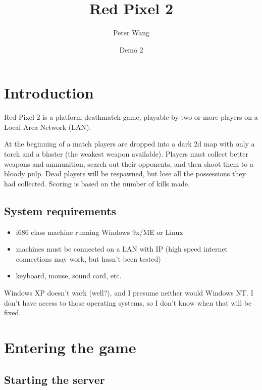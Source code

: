 \documentclass[a4paper,titlepage]{article}
\begin{document}
\newcommand{\key}[1]{\fbox{\texttt{#1}}}


\title{Red Pixel 2}
\date{Demo 2}
\author{Peter Wang}
\maketitle

\tableofcontents
\newpage


\section{Introduction}

Red Pixel 2 is a platform deathmatch game, playable by two or more
players on a Local Area Network (LAN).

At the beginning of a match players are dropped into a dark 2d map
with only a torch and a blaster (the weakest weapon available).
Players must collect better weapons and ammunition, search out their
opponents, and then shoot them to a bloody pulp.  Dead players will be
respawned, but lose all the possessions they had collected.  Scoring
is based on the number of kills made.


\subsection{System requirements}

\begin{itemize}
\item i686 class machine running Windows 9x/ME or Linux
\item machines must be connected on a LAN with IP (high speed internet
  connections may work, but hasn't been tested)
\item keyboard, mouse, sound card, etc.
\end{itemize}

Windows XP doesn't work (well?), and I presume neither would Windows
NT.  I don't have access to those operating systems, so I don't know
when that will be fixed.



\section{Entering the game}


\subsection{Starting the server}
\end{document}
